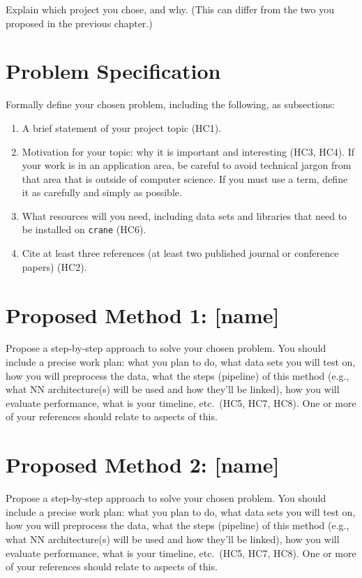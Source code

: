 \documentclass{report}
\begin{document}
Explain which project you chose, and why. (This can differ from the two you proposed in the previous chapter.) 

\section{Problem Specification}

Formally define your chosen problem, including the following, as subsections:
\begin{enumerate}
    \item A brief statement of your project topic (HC1).
    \item Motivation for your topic: why it is important and interesting (HC3, HC4). If your work is in an application area, be careful to avoid technical jargon from that area that is outside of computer science. If you must use a term, define it as carefully and simply as possible.
   \item What resources will you need, including data sets and libraries that need to be installed on {\tt crane} (HC6).
   \item Cite at least three references (at least two published journal or conference papers) (HC2).
\end{enumerate}

\section{Proposed Method 1: [name]}

Propose a step-by-step approach to solve your chosen problem.  You should include 
a precise work plan: what you plan to do, what data sets you will test on, how you will preprocess the data, what the steps (pipeline) of this method (e.g., what NN architecture(s) will be used and how they'll be linked), how you will evaluate performance, what is your timeline, etc.\ (HC5, HC7, HC8).  One or more of your references should relate to aspects of this. 


\section{Proposed Method 2: [name]}

Propose a step-by-step approach to solve your chosen problem.  You should include 
a precise work plan: what you plan to do, what data sets you will test on, how you will preprocess the data, what the steps (pipeline) of this method (e.g., what NN architecture(s) will be used and how they'll be linked), how you will evaluate performance, what is your timeline, etc.\ (HC5, HC7, HC8).  One or more of your references should relate to aspects of this. 
\end{document}
